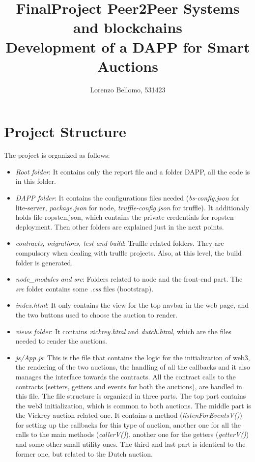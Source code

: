 \documentclass[11pt, a4paper]{report}
\title{
	FinalProject Peer2Peer Systems and blockchains \\
	\large Development of a DAPP for Smart Auctions}
\author{Lorenzo Bellomo, 531423}
\date{}
\begin{document}
	\maketitle
	
\section*{Project Structure}
The project is organized as follows:
\begin{itemize}
	\item \emph{Root folder}: It contains only the report file and a folder DAPP, all the code is in this folder.
	\item \emph{DAPP folder}: It contains the configurations files needed (\emph{bs-config.json} for lite-server, \emph{package.json} for node, \emph{truffle-config.json} for truffle). It additionaly holds file ropsten.json, which contains the private credentials for ropsten deployment. Then other folders are explained just in the next points.
	\item \emph{contracts, migrations, test and build}: Truffle related folders. They are compulsory when dealing with truffle projects. Also, at this level, the build folder is generated.
	\item \emph{node\_modules and src}: Folders related to node and the front-end part. The \emph{src} folder contains some \emph{.css} files (bootstrap).
	\item \emph{index.html}: It only contains the view for the top navbar in the web page, and the two buttons used to choose the auction to render.
	\item \emph{views folder}: It contains \emph{vickrey.html} and \emph{dutch.html}, which are the files needed to render the auctions.
	\item \emph{js/App.js}: This is the file that contains the logic for the initialization of web3, the rendering of the two auctions, the handling of all the callbacks and it also manages the interface towards the contracts. All the contract calls to the contracts (setters, getters and events for both the auctions), are handled in this file. The file structure is organized in three parts. The top part contains the web3 initialization, which is common to both auctions. The middle part is the Vickrey auction related one. It contains a method (\emph{listenForEventsV()}) for setting up the callbacks for this type of auction, another one for all the calls to the main methods (\emph{callerV()}), another one for the getters (\emph{getterV()}) and some other small utility ones. The third and last part is identical to the former one, but related to the Dutch auction.
\end{itemize}
\end{document}
